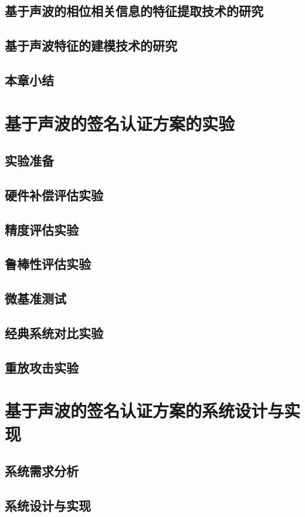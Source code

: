 \section{基于声波的相位相关信息的特征提取技术的研究}
\section{基于声波特征的建模技术的研究}
\section{本章小结}


\chapter{基于声波的签名认证方案的实验}
\section{实验准备}
\section{硬件补偿评估实验}
\section{精度评估实验}
\section{鲁棒性评估实验}
\section{微基准测试}
\section{经典系统对比实验}
\section{重放攻击实验}

\chapter{基于声波的签名认证方案的系统设计与实现}
\section{系统需求分析}
\section{系统设计与实现}
